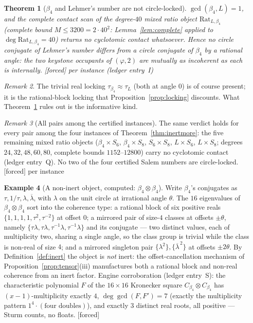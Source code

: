 \documentclass[11pt]{article}
\theoremstyle{plain}
\newtheorem{theorem}{Theorem}[section]
\theoremstyle{definition}
\newtheorem{example}[theorem]{Example}
\theoremstyle{remark}
\newtheorem{remark}[theorem]{Remark}
\newcommand{\Rat}{\mathrm{Rat}}
\newcommand{\F}{\textnormal{[forced]}}
\begin{document}
\begin{theorem}[$\beta_4$ and Lehmer's number are not circle-locked]
\label{thm:notlocked}
$\gcd(\beta_4,L)=1$, and the complete contact scan of the degree-$40$ mixed
ratio object $\Rat_{L,\beta_4}$ (complete bound $M\le3200=2\cdot40^2$:
Lemma~\ref{lem:complete} applied to $\deg\Rat_{L,\beta_4}=40$) returns
\emph{no} cyclotomic
contact whatsoever. Hence no circle conjugate of Lehmer's number differs from a
circle conjugate of $\beta_4$ by a rational angle: the two keystone occupants of
$(\varphi,2)$ are mutually as incoherent as each is internally. \F{} per
instance (ledger entry~I)
\end{theorem}

\begin{remark}
The trivial real locking $\tau_{\beta_4}\approx\tau_L$ (both at angle $0$) is of
course present; it is the rational-block locking that
Proposition~\ref{prop:locking} discounts. What Theorem~\ref{thm:notlocked} rules
out is the informative kind.
\end{remark}

\begin{remark}[All pairs among the certified instances]\label{rem:allpairs}
The same verdict holds for every pair among the four instances of
Theorem~\ref{thm:inertmore}: the five remaining mixed ratio objects
($\beta_4\times S_6$, $\beta_4\times S_8$, $S_6\times S_8$, $L\times S_6$,
$L\times S_8$; degrees $24,32,48,60,80$, complete bounds $1152$--$12800$)
carry no cyclotomic contact (ledger entry~Q). No two of the four certified
Salem numbers are circle-locked. \F{} per instance
\end{remark}

\begin{example}[A non-inert object, computed: $\beta_4\otimes\beta_4$]
\label{ex:tensorsq}
Write $\beta_4$'s conjugates as $\tau,1/\tau,\lambda,\overline\lambda$, with
$\lambda$ on the unit circle at irrational angle $\theta$. The $16$
eigenvalues of $\beta_4\otimes\beta_4$ sort into the coherence type: a
rational block of six positive reals $\{1,1,1,1,\tau^2,\tau^{-2}\}$ at
offset $0$; a mirrored pair of size-$4$ classes at offsets $\pm\theta$,
namely $\{\tau\lambda,\tau\lambda,\tau^{-1}\lambda,\tau^{-1}\lambda\}$ and
its conjugate --- two distinct values, each of multiplicity two, sharing a
single angle, so the class group is trivial while the class is non-real of
size $4$; and a mirrored singleton pair
$\{\lambda^2\},\{\overline\lambda^{\,2}\}$ at offsets $\pm2\theta$. By
Definition~\ref{def:inert} the object is \emph{not} inert: the
offset-cancellation mechanism of Proposition~\ref{prop:tensor}(iii)
manufactures both a rational block and non-real coherence from an inert
factor. Engine corroboration (ledger entry~S): the characteristic polynomial
$F$ of the $16\times16$ Kronecker square $C_{\beta_4}\otimes C_{\beta_4}$
has $(x-1)$-multiplicity exactly $4$, $\deg\gcd(F,F')=7$ (exactly the
multiplicity pattern $1^4\cdot(\text{four doubles})$), and exactly $3$
distinct real roots, all positive --- Sturm counts, no floats. \F
\end{example}
\end{document}

